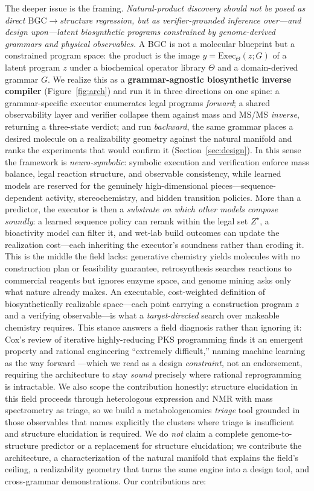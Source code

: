 \documentclass[11pt]{article}
\theoremstyle{definition}
\begin{document}
The deeper issue is the framing. \emph{Natural-product discovery should not be posed as direct
$\mathrm{BGC}\!\to\!$structure regression, but as verifier-grounded inference over---and design
upon---latent biosynthetic programs constrained by genome-derived grammars and physical
observables.} A BGC is not a molecular blueprint but a constrained program space: the product is the
image $y=\mathrm{Exec}_{\Theta}(z;G)$ of a latent program $z$ under a biochemical operator library
$\Theta$ and a domain-derived grammar $G$. We realize this as a \textbf{grammar-agnostic biosynthetic
inverse compiler} (Figure~\ref{fig:arch}) and run it in three directions on one spine: a
grammar-specific executor enumerates legal programs \emph{forward}; a shared observability layer and
verifier collapse them against mass and MS/MS \emph{inverse}, returning a three-state verdict; and
run \emph{backward}, the same grammar places a desired molecule on a realizability geometry against
the natural manifold and ranks the experiments that would confirm it (Section~\ref{sec:design}). In
this sense the framework is \emph{neuro-symbolic}: symbolic execution and verification enforce mass
balance, legal reaction structure, and observable consistency, while learned models are reserved for
the genuinely high-dimensional pieces---sequence-dependent activity, stereochemistry, and hidden
transition policies. More than a predictor, the executor is then a \emph{substrate on which other
models compose soundly}: a learned sequence policy can rerank within the legal set $Z^{\star}$, a
bioactivity model can filter it, and wet-lab build outcomes can update the realization cost---each
inheriting the executor's soundness rather than eroding it. This is the middle the field lacks:
generative chemistry yields molecules with no construction plan or feasibility guarantee,
retrosynthesis searches reactions to commercial reagents but ignores enzyme space, and genome mining
asks only what nature already makes. An executable, cost-weighted definition of biosynthetically
realizable space---each point carrying a construction program $z$ and a verifying observable---is what
a \emph{target-directed} search over makeable chemistry requires. This stance answers a field
diagnosis rather than ignoring it: Cox's review of
iterative highly-reducing PKS programming finds it an emergent property and rational engineering
``extremely difficult,'' naming machine learning as the way forward \citep{cox2023}---which we read
as a design \emph{constraint}, not an endorsement, requiring the architecture to stay \emph{sound}
precisely where rational reprogramming is intractable. We also scope the contribution honestly:
structure elucidation in this field proceeds through heterologous expression and NMR with mass
spectrometry as triage, so we build a metabologenomics \emph{triage} tool grounded in those
observables that names explicitly the clusters where triage is insufficient and structure
elucidation is required. We do \emph{not} claim a complete genome-to-structure predictor or a
replacement for structure elucidation; we contribute the architecture, a characterization of the
natural manifold that explains the field's ceiling, a realizability geometry that turns the same
engine into a design tool, and cross-grammar demonstrations. Our contributions are:
\end{document}
